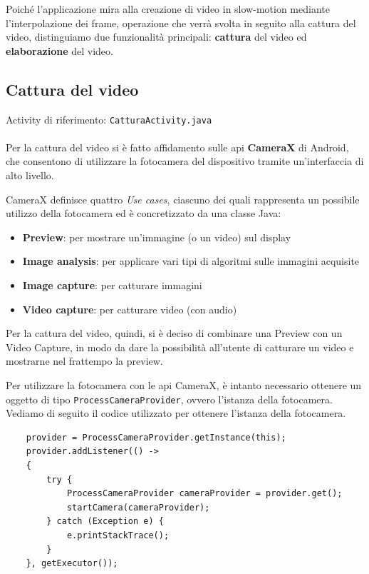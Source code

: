 Poiché l'applicazione mira alla creazione di video in slow-motion mediante l'interpolazione dei frame, operazione che verrà
svolta in seguito alla cattura del video, distinguiamo due funzionalità principali: 
\textbf{cattura} del video ed \textbf{elaborazione} del video.

\subsection*{Cattura del video}

Activity di riferimento: \texttt{CatturaActivity.java} \\ \\
Per la cattura del video si è fatto affidamento sulle api \textbf{CameraX} di Android, che consentono di utilizzare la 
fotocamera del dispositivo tramite un'interfaccia di alto livello.

CameraX definisce quattro \textit{Use cases}, ciascuno dei quali rappresenta un possibile utilizzo della fotocamera ed è
concretizzato da una classe Java:
\begin{itemize}
    \item \textbf{Preview}: per mostrare un'immagine (o un video) sul display
    \item \textbf{Image analysis}: per applicare vari tipi di algoritmi sulle immagini acquisite
    \item \textbf{Image capture}: per catturare immagini
    \item \textbf{Video capture}: per catturare video (con audio)
\end{itemize}

Per la cattura del video, quindi, si è deciso di combinare una Preview con un Video Capture, in modo da dare la possibilità
all'utente di catturare un video e mostrarne nel frattempo la preview.

Per utilizzare la fotocamera con le api CameraX, è intanto necessario ottenere un oggetto di tipo \texttt{ProcessCameraProvider}, 
ovvero l'istanza della fotocamera. Vediamo di seguito il codice utilizzato per ottenere l'istanza della fotocamera.

\begin{lstlisting}
    provider = ProcessCameraProvider.getInstance(this);
    provider.addListener(() ->
    {
        try {
            ProcessCameraProvider cameraProvider = provider.get();
            startCamera(cameraProvider);
        } catch (Exception e) {
            e.printStackTrace();
        }
    }, getExecutor());
\end{lstlisting}


